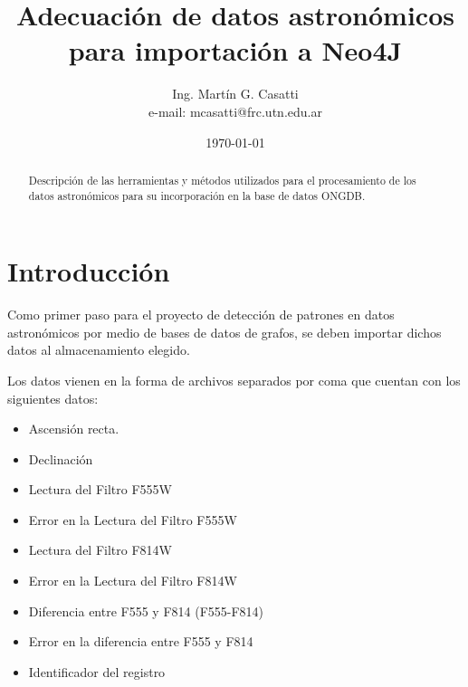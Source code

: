 \documentclass[a4paper,headsepline,footsepline,draft=false]{scrartcl}
\def\borrador{}
\begin{document}
\title{Adecuación de datos astronómicos para importación a Neo4J}
\author{Ing. Martín G. Casatti \\ e-mail: mcasatti@frc.utn.edu.ar}
\date{\today}
\maketitle
\thispagestyle{headings}

\begin{abstract}
	Descripción de las herramientas y métodos utilizados para el procesamiento de los datos astronómicos para su incorporación en la base de datos ONGDB.
\end{abstract}

%
%
%
%

\section{Introducción}

Como primer paso para el proyecto de detección de patrones en datos astronómicos por medio de bases de datos de grafos, se deben importar dichos datos al almacenamiento elegido.

Los datos vienen en la forma de archivos separados por coma que cuentan con los siguientes datos:

\begin{itemize}
	\item Ascensión recta.
	\item Declinación
	\item Lectura del Filtro F555W
	\item Error en la Lectura del Filtro F555W
	\item Lectura del Filtro F814W
	\item Error en la Lectura del Filtro F814W
	\item Diferencia entre F555 y F814 (F555-F814)
	\item Error en la diferencia entre F555 y F814
	\item Identificador del registro
\end{itemize}
\end{document}
